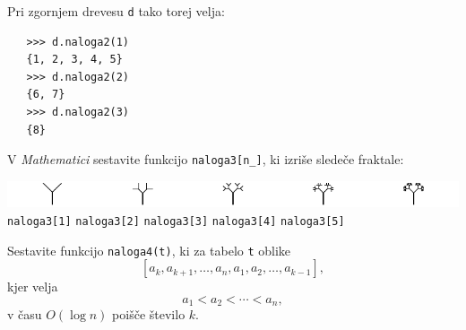 \documentclass[arhiv]{izpit}
\begin{document}
Pri zgornjem drevesu \verb|d| tako torej velja:
{\small\begin{verbatim}
   >>> d.naloga2(1)
   {1, 2, 3, 4, 5}
   >>> d.naloga2(2)
   {6, 7}
   >>> d.naloga2(3)
   {8}\end{verbatim}}

\naloga[25 točk]
V \emph{Mathematici} sestavite funkcijo \verb|naloga3[n_]|,
  ki izriše sledeče fraktale:

\begin{center}
  \includegraphics[width=\textwidth]{drevesa.pdf} \\
  \verb|naloga3[1]|\qquad
  \verb|naloga3[2]|\qquad
  \verb|naloga3[3]|\qquad
  \verb|naloga3[4]|\qquad
  \verb|naloga3[5]|
\end{center}

\naloga[25 točk]

Sestavite funkcijo \verb|naloga4(t)|, ki za tabelo \verb|t| oblike
\[
  [a_k, a_{k + 1}, \dots, a_n, a_1, a_2, \dots, a_{k - 1}],
\]
kjer velja
\[
  a_1 < a_2 < \cdots < a_n,
\]
v času $O(\log n)$ poišče število $k$.




\end{document}
